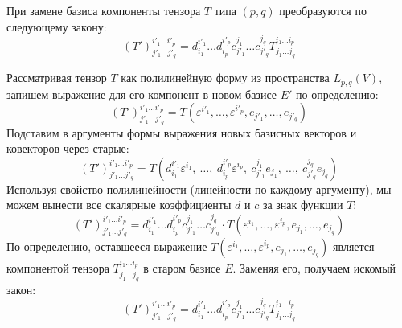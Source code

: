 \documentclass[14pt]{extreport}
\begin{document}
    \begin{thbox}
        При замене базиса компоненты тензора $T$ типа $(p, q)$ преобразуются по следующему закону:$$(T')^{i'_1 \dots i'_p}_{j'_1 \dots j'_q} = d_{i_1}^{i'_1} \dots d_{i_p}^{i'_p} c_{j'_1}^{j_1} \dots c_{j'_q}^{j_q} T^{i_1 \dots i_p}_{j_1 \dots j_q}$$
    \end{thbox}

    \begin{prbox}
        Рассматривая тензор $T$ как полилинейную форму из пространства $L_{p,q}(V)$, запишем выражение для его компонент в новом базисе $E'$ по определению:$$(T')^{i'_1 \dots i'_p}_{j'_1 \dots j'_q} = T(\varepsilon^{i'_1}, \dots, \varepsilon^{i'_p}, e_{j'_1}, \dots, e_{j'_q})$$Подставим в аргументы формы выражения новых базисных векторов и ковекторов через старые:$$(T')^{i'_1 \dots i'_p}_{j'_1 \dots j'_q} = T(d_{i_1}^{i'_1} \varepsilon^{i_1}, \ \dots, \ d_{i_p}^{i'_p} \varepsilon^{i_p}, \ c_{j'_1}^{j_1} e_{j_1}, \ \dots, \ c_{j'_q}^{j_q} e_{j_q})$$Используя свойство полилинейности (линейности по каждому аргументу), мы можем вынести все скалярные коэффициенты $d$ и $c$ за знак функции $T$:$$(T')^{i'_1 \dots i'_p}_{j'_1 \dots j'_q} = d_{i_1}^{i'_1} \dots d_{i_p}^{i'_p} c_{j'_1}^{j_1} \dots c_{j'_q}^{j_q} \cdot T(\varepsilon^{i_1}, \dots, \varepsilon^{i_p}, e_{j_1}, \dots, e_{j_q})$$По определению, оставшееся выражение $T(\varepsilon^{i_1}, \dots, \varepsilon^{i_p}, e_{j_1}, \dots, e_{j_q})$ является компонентой тензора $T^{i_1 \dots i_p}_{j_1 \dots j_q}$ в старом базисе $E$. Заменяя его, получаем искомый закон:$$(T')^{i'_1 \dots i'_p}_{j'_1 \dots j'_q} = d_{i_1}^{i'_1} \dots d_{i_p}^{i'_p} c_{j'_1}^{j_1} \dots c_{j'_q}^{j_q} T^{i_1 \dots i_p}_{j_1 \dots j_q}$$
    \end{prbox}
\end{document}
